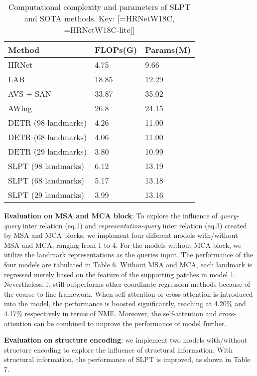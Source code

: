 \documentclass[10pt,twocolumn,letterpaper]{article}
\begin{document}
\begin{table}[t!]
	\centering
	\begin{tabular}{m{3.8cm}<{\centering}|m{1.5cm}<{\centering}m{1.5cm}<{\centering}}
		\hline
		Method & FLOPs(G) & Params(M) \\ \hline
		HRNet \cite{HRnet} & 4.75 & 9.66 \\
		LAB \cite{LAB} & 18.85 & 12.29 \\
		AVS + SAN\ \cite{AVS} & 33.87 & 35.02 \\
		AWing \cite{Awing} & 26.8 & 24.15 \\ \hline
		DETR (98 landmarks) \cite{DETR} & 4.26 & 11.00 \\ 
		DETR (68 landmarks) \cite{DETR} & 4.06 & 11.00 \\
		DETR (29 landmarks) \cite{DETR} & 3.80 & 10.99 \\\hline
		SLPT (98 landmarks) & 6.12 & 13.19 \\
		SLPT (68 landmarks) & 5.17 & 13.18 \\
		SLPT (29 landmarks) & 3.99 & 13.16 \\ \hline
	\end{tabular}
	\caption{Computational complexity and parameters of SLPT and SOTA methods. Key: [=HRNetW18C, =HRNetW18C-lite]]}
	\label{Tabal8}
\end{table}	

\textbf{Evaluation on MSA and MCA block}: To explore the influence of \textit{query-query} inter relation (eq.1) and \textit{representation-query} inter relation (eq.3) created by MSA and MCA blocks, we implement four different models with/without MSA and MCA, ranging from 1 to 4. For the models without MCA block, we utilize the landmark representations as the queries input. The performance of the four models are tabulated in Table 6. Without MSA and MCA, each landmark is regressed merely based on the feature of the supporting patches in model 1. Nevertheless, it still outperforms other coordinate regression methods because of the coarse-to-fine framework. When self-attention or cross-attention is introduced into the model, the performance is boosted significantly, reaching at 4.20\% and 4.17\% respectively in terms of NME. Moreover, the self-attention and cross-attention can be combined to improve the performance of model further.


\textbf{Evaluation on structure encoding}: we implement two models with/without structure encoding to explore the influence of structural information. With structural information, the performance of SLPT is improved, as shown in Table 7.
\end{document}

